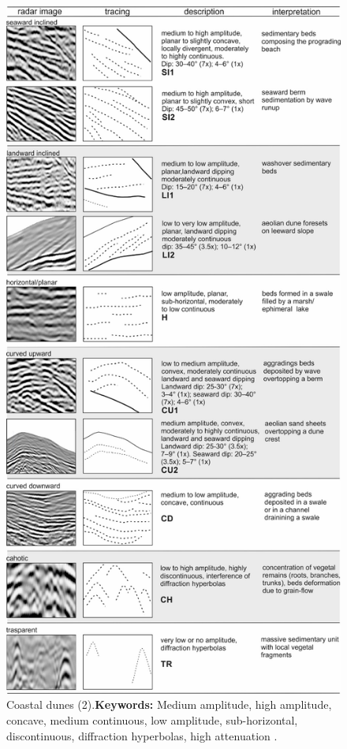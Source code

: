 \begin{figure}[h!]
    \centering
    \includegraphics[width=0.75\linewidth]{Figures/0.2GPR/Ribolini2021_dunes_2.png}
    \caption[Coastal dunes (2).]{Coastal dunes (2).\textbf{Keywords: } Medium amplitude, high amplitude, concave, medium continuous, low amplitude, sub-horizontal, discontinuous, diffraction hyperbolas, high attenuation \citep{Ribolini2021}.}
    \label{fig:Ribolini2021-2}
\end{figure}


